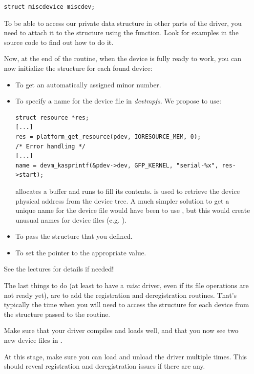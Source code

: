\begin{verbatim}
struct miscdevice miscdev;
\end{verbatim}

To be able to access our private data structure in other parts of the
driver, you need to attach it to the  structure using the
 function. Look for examples in the
source code to find out how to do it.

Now, at the end of the  routine, when the device is fully ready
to work, you can now initialize the  structure
for each found device:

\begin{itemize}
\item To get an automatically assigned minor number.
\item To specify a name for the device file in {\em devtmpfs}. We
  propose to use:
  \begin{verbatim}
struct resource *res;
[...]
res = platform_get_resource(pdev, IORESOURCE_MEM, 0);
/* Error handling */
[...]
name = devm_kasprintf(&pdev->dev, GFP_KERNEL, "serial-%x", res->start);
  \end{verbatim}
   allocates a buffer and runs 
  to fill its contents.  is used to
  retrieve the device physical address from the device tree.
  A much simpler solution to get a unique name for the device file
  would have been to use , but this would create
  unusual names for device files (e.g. ).
\item To pass the  structure that you defined.
\item To set the  pointer to the appropriate value.
\end{itemize}

See the lectures for details if needed!

The last things to do (at least to have a {\em misc} driver, even if
its file operations are not ready yet), are to add the registration and
deregistration routines. That's typically the time when you will need
to access the  structure for each device from the
 structure passed to the  routine.

Make sure that your driver compiles and loads well, and that you
now see two new device files in .

At this stage, make sure you can load and unload the driver multiple
times. This should reveal registration and deregistration issues if
there are any.

